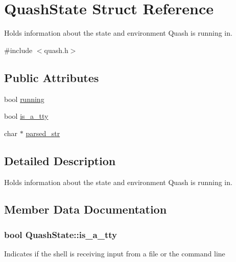 \hypertarget{structQuashState}{}\section{Quash\+State Struct Reference}
\label{structQuashState}


Holds information about the state and environment Quash is running in.  




{\ttfamily \#include $<$quash.\+h$>$}

\subsection*{Public Attributes}
\begin{DoxyCompactItemize}
\item 
bool \hyperlink{structQuashState_a7db3a718696ee9d0c7f8b649ccb88bb4}{running}
\item 
bool \hyperlink{structQuashState_a6d92242ecd91c33779ea2deae58956bf}{is\+\_\+a\+\_\+tty}
\item 
char $\ast$ \hyperlink{structQuashState_a69d0ad3cb3bf44a92459020d98814f7e}{parsed\+\_\+str}
\end{DoxyCompactItemize}


\subsection{Detailed Description}
Holds information about the state and environment Quash is running in. 

\subsection{Member Data Documentation}
\subsubsection[{\texorpdfstring{is\+\_\+a\+\_\+tty}{is\_a\_tty}}]{\setlength{\rightskip}{0pt plus 5cm}bool Quash\+State\+::is\+\_\+a\+\_\+tty}\hypertarget{structQuashState_a6d92242ecd91c33779ea2deae58956bf}{}\label{structQuashState_a6d92242ecd91c33779ea2deae58956bf}
Indicates if the shell is receiving input from a file or the command line 
